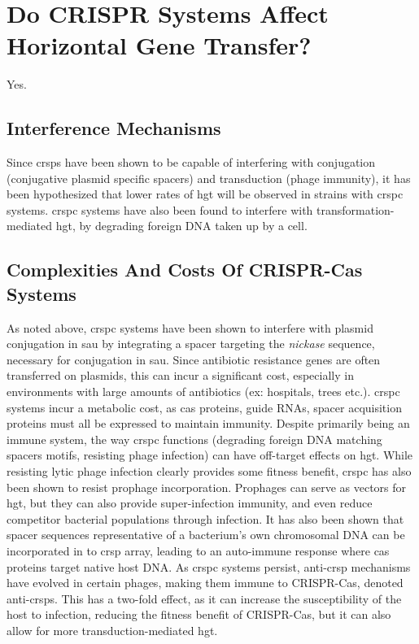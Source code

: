 \documentclass[12pt,letter]{article}
\begin{document}
\section*{Do CRISPR Systems Affect Horizontal Gene Transfer?}
Yes.
\subsection*{Interference Mechanisms}
Since \ac{crsp}s have been shown to be capable of interfering with conjugation (conjugative plasmid specific spacers) and transduction (phage immunity), it has been hypothesized that lower rates of \ac{hgt} will be observed in strains with \ac{crspc} systems\citep{staphlim}.
\ac{crspc} systems have also been found to interfere with transformation-mediated \ac{hgt}, by degrading foreign DNA taken up by a cell\citep{climtrans}.
\subsection*{Complexities And Costs Of CRISPR-Cas Systems}
As noted above, \ac{crspc} systems have been shown to interfere with plasmid conjugation in \ac{sau} by integrating a spacer targeting the \textit{nickase} sequence, necessary for conjugation in \ac{sau}\citep{staphlim}.
Since antibiotic resistance genes are often transferred on plasmids, this can incur a significant cost, especially in environments with large amounts of antibiotics (ex: hospitals, trees etc.)\citep{hospital}.
\ac{crspc} systems incur a metabolic cost, as \ac{cas} proteins, guide RNAs, spacer acquisition proteins must all be expressed to maintain immunity\citep{crispgen}.
Despite primarily being an immune system, the way \ac{crspc} functions (degrading foreign DNA matching spacers motifs, resisting phage infection) can have off-target effects on \ac{hgt}\citep{acqorres}.
While resisting lytic phage infection clearly provides some fitness benefit, \ac{crspc} has also been shown to resist prophage incorporation\citep{acqorres}.
Prophages can serve as vectors for \ac{hgt}, but they can also provide super-infection immunity, and even reduce competitor bacterial populations through infection\citep{acqorres,transhgt}.
It has also been shown that spacer sequences representative of a bacterium's own chromosomal DNA can be incorporated in to \ac{crsp} array, leading to an auto-immune response where \ac{cas} proteins target native host DNA\citep{selfcrisp}.
As \ac{crspc} systems persist, anti-\ac{crsp} mechanisms have evolved in certain phages, making them immune to CRISPR-Cas, denoted anti-\ac{crsp}s\citep{acqorres}.
This has a two-fold effect, as it can increase the susceptibility of the host to infection, reducing the fitness benefit of CRISPR-Cas, but it can also allow for more transduction-mediated \ac{hgt}\citep{acqorres}.
\end{document}
